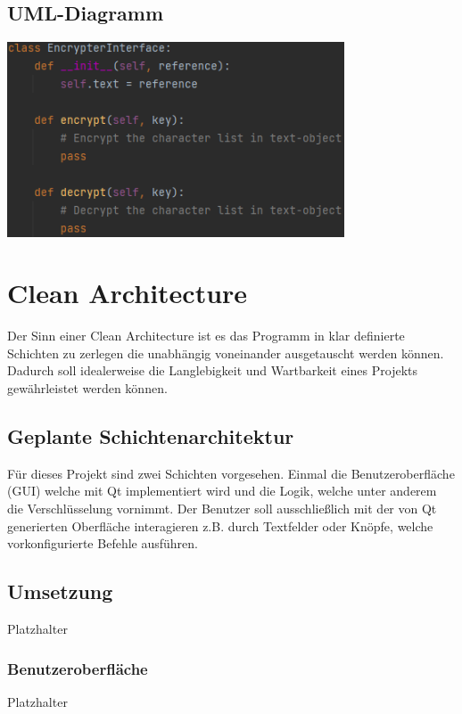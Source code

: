 \documentclass[12pt]{article}
\begin{document}

\subsection{UML-Diagramm}
\begin{center}
	\includegraphics[width=10cm]{bilder/Decorator_before.png}
\end{center}
\newpage

\section{Clean Architecture}
Der Sinn einer Clean Architecture ist es das Programm in klar definierte Schichten zu zerlegen die unabhängig voneinander ausgetauscht werden können. Dadurch soll idealerweise die Langlebigkeit und Wartbarkeit eines Projekts gewährleistet werden können.

\subsection{Geplante Schichtenarchitektur}
Für dieses Projekt sind zwei Schichten vorgesehen. Einmal die Benutzeroberfläche (GUI) welche mit Qt implementiert wird und die Logik, welche unter anderem die Verschlüsselung vornimmt. Der Benutzer soll ausschließlich mit der von Qt generierten Oberfläche interagieren z.B. durch Textfelder oder Knöpfe, welche vorkonfigurierte Befehle ausführen.

\subsection{Umsetzung}
Platzhalter

\subsubsection{Benutzeroberfläche}
Platzhalter
\end{document}

